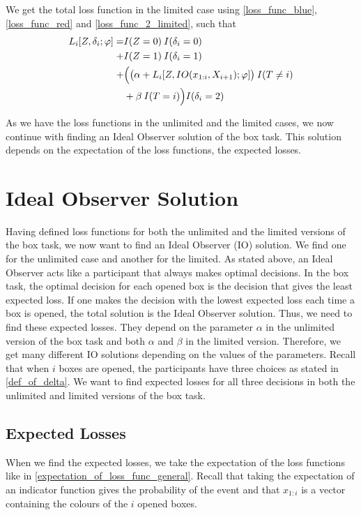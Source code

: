 We get the total loss function in the limited case using \eqref{loss_func_blue}, \eqref{loss_func_red} and \eqref{loss_func_2_limited}, such that
\begin{equation}
\label{total_loss_limited}
    \begin{aligned}
       L_i[Z,\delta_{i};\varphi] 
       =& I(Z=0)\: I(\delta_i=0) \\
       +& I(Z=1)\: I(\delta_i=1)\\
       +& \Big(  \big( \alpha + L_i[Z,IO(x_{1:i},X_{i+1});\varphi] \big) \: I(T\neq i) \\        
       &+ \beta \: I(T=i)  \Big) I(\delta_i=2)
    \end{aligned}
\end{equation}

As we have the loss functions in the unlimited and the limited cases, we now continue with finding an Ideal Observer solution of the box task. This solution depends on the expectation of the loss functions, the expected losses. 

\section{Ideal Observer Solution}
Having defined loss functions for both the unlimited and the limited versions of the box task, we now want to find an Ideal Observer (IO) solution. We find one for the unlimited case and another for the limited. As stated above, an Ideal Observer acts like a participant that always makes optimal decisions. In the box task, the optimal decision for each opened box is the decision that gives the least expected loss. If one makes the decision with the lowest expected loss each time a box is opened, the total solution is the Ideal Observer solution. Thus, we need to find these expected losses. They depend on the parameter $\alpha$ in the unlimited version of the box task and both $\alpha$ and $\beta$ in the limited version. Therefore, we get many different IO solutions depending on the values of the parameters. 
Recall that when $i$ boxes are opened, the participants have three choices as stated in \eqref{def_of_delta}. We want to find expected losses for all three decisions in both the unlimited and limited versions of the box task. 


 

\subsection{Expected Losses}
\label{section:exp_losses}
When we find the expected losses, we take the expectation of the loss functions like in \eqref{expectation_of_loss_func_general}. Recall that taking the expectation of an indicator function gives the probability of the event and that $x_{1:i}$ is a vector containing the colours of the $i$ opened boxes.

